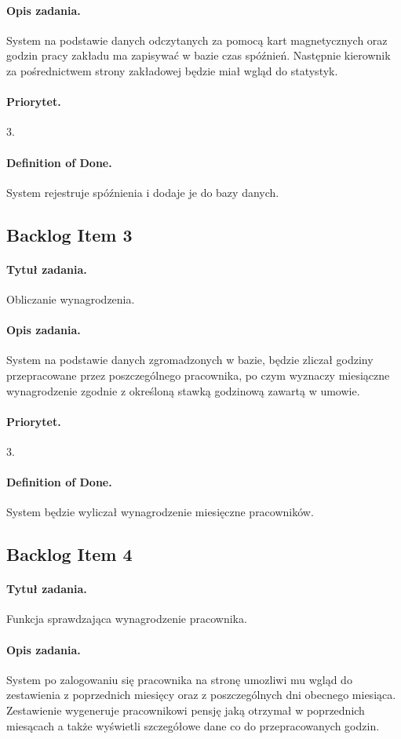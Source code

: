 \documentclass[a4paper]{article}
\begin{document}
\paragraph{Opis zadania.} System na podstawie danych odczytanych za pomocą kart magnetycznych oraz godzin pracy zakładu ma zapisywać w bazie czas spóźnień. Następnie kierownik za pośrednictwem strony zakładowej będzie miał wgląd do statystyk.
\paragraph{Priorytet.} 3.
\paragraph{Definition of Done.} System rejestruje spóźnienia i dodaje je do bazy danych. 

\subsection{Backlog Item 3}
\paragraph{Tytuł zadania.} Obliczanie wynagrodzenia.
\paragraph{Opis zadania.} System na podstawie danych zgromadzonych w bazie, będzie zliczał godziny przepracowane przez poszczególnego pracownika, po czym wyznaczy miesiączne wynagrodzenie zgodnie z określoną stawką godzinową zawartą w umowie.
\paragraph{Priorytet.} 3.
\paragraph{Definition of Done.} System będzie wyliczał wynagrodzenie miesięczne pracowników.

\subsection{Backlog Item 4}
\paragraph{Tytuł zadania.} Funkcja sprawdzająca wynagrodzenie pracownika.
\paragraph{Opis zadania.} System po zalogowaniu się pracownika na stronę umozliwi mu wgląd do zestawienia z poprzednich miesięcy oraz z poszczególnych dni obecnego miesiąca. Zestawienie wygeneruje pracownikowi pensję jaką otrzymał w poprzednich miesącach a także wyświetli szczegółowe dane co do przepracowanych godzin.
\end{document}

